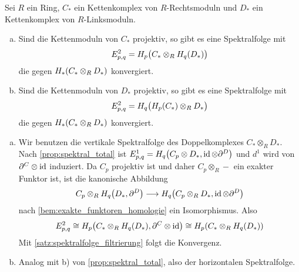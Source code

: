 \begin{proposition}[{name=[{Spektralfolgen zum Tensorprodukt von Kettenkomplexen}]},label=prop:spektralfolgen_konv_homlo_tensor]
	Sei $R$ ein Ring, $C_*$ ein Kettenkomplex von $R$-Rechtsmoduln und $D_*$ ein Kettenkomplex von $R$-Linksmoduln.
	\begin{enumerate}[a)]
		\item Sind die Kettenmoduln von $C_*$ projektiv, so gibt es eine Spektralfolge mit 
		\[
			E^2_{p,q} = H_p \enbrace[\big]{C_* \otimes_R H_q(D_*)} 
		\]
		die gegen $H_* \enbrace*{C_* \otimes_R D_{*}}$ konvergiert.
		\item Sind die Kettenmoduln von $D_*$ projektiv, so gibt es eine Spektralfolge mit 
		\[
			E^2_{p,q} = H_q \enbrace[\big]{H_p(C_*) \otimes_R D_*} 
		\]
		die gegen $H_* \enbrace*{C_* \otimes_R D_*}$ konvergiert.
	\end{enumerate}
\end{proposition}
\begin{beweis}
	\leavevmode
	\begin{enumerate}[a)]
		\item Wir benutzen die vertikale Spektralfolge des Doppelkomplexes $C_* \otimes_R D_*$.
		Nach \autoref{prop:spektral_total} ist $E^1_{p,q}= H_q \enbrace*{C_p \otimes D_*, \id \otimes \partial^D}$ und $d^1$ wird von $\partial^C \otimes \id$ induziert.
		Da $C_p$ projektiv ist und daher $C_p \otimes_R -$ ein exakter Funktor ist, ist die kanonische Abbildung 
		\[
			C_p \otimes_R H_q \enbrace*{D_*,\partial^D} \longrightarrow H_q \enbrace*{C_p \otimes_R D_*, \id \otimes \partial^D} 
		\]
		nach \autoref{bem:exakte_funktoren_homologie} ein Isomorphismus. Also 
		\[
			E^2_{p,q} \cong H_p \enbrace*{C_* \otimes_R H_q(D_*), \partial^C \otimes \id} \cong H_p \enbrace*{C_* \otimes_R H_q(D_*)}
		\]
		Mit \autoref{satz:spektralfolge_filtrierung} folgt die Konvergenz.
		\item Analog mit b) von \autoref{prop:spektral_total}, also der horizontalen Spektralfolge.\qedhere
	\end{enumerate}
\end{beweis}

